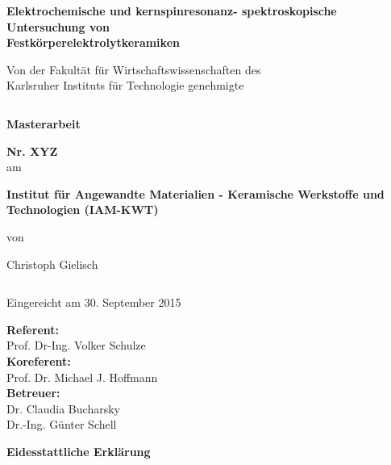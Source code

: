 \documentclass[a4paper, 11pt, headsepline,footsepline,twoside,abstract]{scrbook}
\begin{document}
\begin{center}
\textbf{\huge{ Elektrochemische und kern\-spin\-resonanz- spek\-tros\-ko\-pische Untersuchung von\\[0.4cm]Festkörperelektrolytkeramiken}}
\end{center}
\begin{center}
\textbf{\Large{}}
\end{center}
\begin{center}
\large{Von der Fakultät für Wirtschaftswissenschaften des \\ Karlsruher Instituts für Technologie genehmigte }
\end{center}
\begin{verbatim}

\end{verbatim}
\begin{center}
\textbf{\LARGE{Masterarbeit}}
\end{center}
\begin{center}
\textbf{\Large{Nr. XYZ}}\\
am
\end{center}
\begin{center}
\textbf{\Large{Institut für Angewandte Materialien - Keramische Werkstoffe und Technologien (IAM-KWT)}}
\end{center}
\begin{center}
von
\end{center}
\begin{center}
\Large{Christoph Gielisch}
\end{center}
\begin{verbatim}
\end{verbatim}
\begin{center}
Eingereicht am 30. September 2015
\end{center}
\begin{center}
\textbf{Referent:} \\ Prof. Dr-Ing. Volker Schulze \\
\textbf{Koreferent:} \\ Prof. Dr. Michael J. Hoffmann\\
\textbf{Betreuer:} \\ Dr. Claudia Bucharsky \\ 
Dr.-Ing. Günter Schell \\
\end{center}
\newpage
\cleardoubleemptypage
\setcounter{page}{1}
\textbf{\Large{Eidesstattliche Erklärung}}
\\\\
\end{document}
